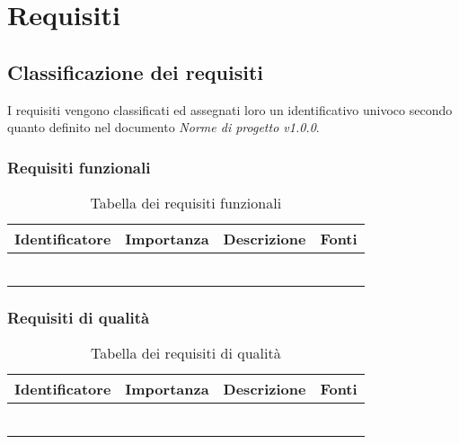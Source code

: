 \documentclass[AnalisiDeiRequisiti.tex]{subfiles}
\begin{document}
\chapter{Requisiti}
\section{Classificazione dei requisiti}
I requisiti vengono classificati ed assegnati loro un identificativo univoco secondo quanto definito nel documento \textit{Norme di progetto v1.0.0}.


\subsection{Requisiti funzionali}

\label{table:Tabella requisiti funzionali}
\begin{longtable}[H]{|l|l|l|l|}
	\hline
	\rowcolor[HTML]{38FFF8} 
	\textbf{Identificatore} & \textbf{Importanza} & \textbf{Descrizione} & \textbf{Fonti} \\ \hline
	\endhead
	 &  &  &  \\ \hline
	 &  &  &  \\ \hline
	 &  &  &  \\ \hline
	 &  &  &  \\ \hline
	 &  &  &  \\ \hline
	\caption{Tabella dei requisiti funzionali}
\end{longtable}

\subsection{Requisiti di qualità}

\label{table:Tabella requisiti di qualita'} %
\begin{longtable}[H]{|l|l|l|l|}
	\hline
	\rowcolor[HTML]{38FFF8} 
	\textbf{Identificatore} & \textbf{Importanza} & \textbf{Descrizione} & \textbf{Fonti} \\ \hline
	\endhead
	&  &  &  \\ \hline
	&  &  &  \\ \hline
	&  &  &  \\ \hline
	&  &  &  \\ \hline
	&  &  &  \\ \hline
	\caption{Tabella dei requisiti di qualità}
\end{longtable}
\end{document}
